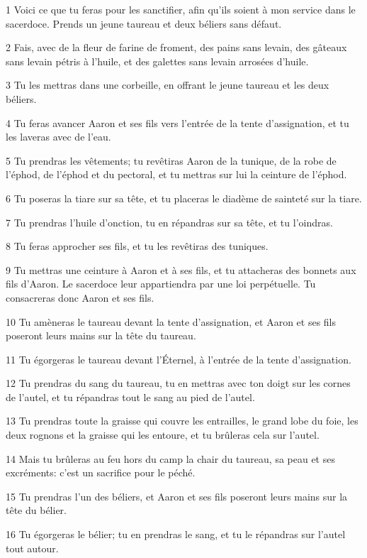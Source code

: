 \par 1 Voici ce que tu feras pour les sanctifier, afin qu'ils soient à mon service dans le sacerdoce. Prends un jeune taureau et deux béliers sans défaut.
\par 2 Fais, avec de la fleur de farine de froment, des pains sans levain, des gâteaux sans levain pétris à l'huile, et des galettes sans levain arrosées d'huile.
\par 3 Tu les mettras dans une corbeille, en offrant le jeune taureau et les deux béliers.
\par 4 Tu feras avancer Aaron et ses fils vers l'entrée de la tente d'assignation, et tu les laveras avec de l'eau.
\par 5 Tu prendras les vêtements; tu revêtiras Aaron de la tunique, de la robe de l'éphod, de l'éphod et du pectoral, et tu mettras sur lui la ceinture de l'éphod.
\par 6 Tu poseras la tiare sur sa tête, et tu placeras le diadème de sainteté sur la tiare.
\par 7 Tu prendras l'huile d'onction, tu en répandras sur sa tête, et tu l'oindras.
\par 8 Tu feras approcher ses fils, et tu les revêtiras des tuniques.
\par 9 Tu mettras une ceinture à Aaron et à ses fils, et tu attacheras des bonnets aux fils d'Aaron. Le sacerdoce leur appartiendra par une loi perpétuelle. Tu consacreras donc Aaron et ses fils.
\par 10 Tu amèneras le taureau devant la tente d'assignation, et Aaron et ses fils poseront leurs mains sur la tête du taureau.
\par 11 Tu égorgeras le taureau devant l'Éternel, à l'entrée de la tente d'assignation.
\par 12 Tu prendras du sang du taureau, tu en mettras avec ton doigt sur les cornes de l'autel, et tu répandras tout le sang au pied de l'autel.
\par 13 Tu prendras toute la graisse qui couvre les entrailles, le grand lobe du foie, les deux rognons et la graisse qui les entoure, et tu brûleras cela sur l'autel.
\par 14 Mais tu brûleras au feu hors du camp la chair du taureau, sa peau et ses excréments: c'est un sacrifice pour le péché.
\par 15 Tu prendras l'un des béliers, et Aaron et ses fils poseront leurs mains sur la tête du bélier.
\par 16 Tu égorgeras le bélier; tu en prendras le sang, et tu le répandras sur l'autel tout autour.
